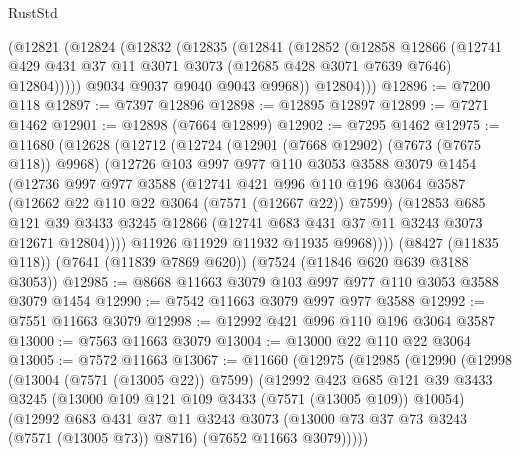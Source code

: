 \begin{lexlean}{RustStd}
\begin{coremodule}
        (@12821
          (@12824
            (@12832
              (@12835
                (@12841
                  (@12852
                    (@12858
                      @12866
                      (@12741
                        @429
                        @431
                        @37
                        @11
                        @3071
                        @3073
                        (@12685 @428 @3071 @7639 @7646)
                        @12804)))))
              @9034
              @9037
              @9040
              @9043
              @9968))
          @12804)))
@12896 := @7200 @118
@12897 := @7397 @12896
@12898 := @12895 @12897
@12899 := @7271 @1462
@12901 := @12898 (@7664 @12899)
@12902 := @7295 @1462
@12975 := @11680
    (@12628
      (@12712
        (@12724
          (@12901 (@7668 @12902) (@7673 (@7675 @118)) @9968)
          (@12726
            @103
            @997
            @977
            @110
            @3053
            @3588
            @3079
            @1454
            (@12736
              @997
              @977
              @3588
              (@12741
                @421
                @996
                @110
                @196
                @3064
                @3587
                (@12662 @22 @110 @22 @3064 (@7571 (@12667 @22)) @7599)
                (@12853
                  @685
                  @121
                  @39
                  @3433
                  @3245
                  @12866
                  (@12741 @683 @431 @37 @11 @3243 @3073 @12671 @12804))))
            @11926
            @11929
            @11932
            @11935
            @9968))))
    (@8427 (@11835 @118))
    (@7641 (@11839 @7869 @620))
    (@7524 (@11846 @620 @639 @3188 @3053))
@12985 := @8668 @11663 @3079 @103 @997 @977 @110 @3053 @3588 @3079 @1454
@12990 := @7542 @11663 @3079 @997 @977 @3588
@12992 := @7551 @11663 @3079
@12998 := @12992 @421 @996 @110 @196 @3064 @3587
@13000 := @7563 @11663 @3079
@13004 := @13000 @22 @110 @22 @3064
@13005 := @7572 @11663
@13067 := @11660
    (@12975
      (@12985
        (@12990
          (@12998
            (@13004 (@7571 (@13005 @22)) @7599)
            (@12992
              @423
              @685
              @121
              @39
              @3433
              @3245
              (@13000 @109 @121 @109 @3433 (@7571 (@13005 @109)) @10054)
              (@12992
                @683
                @431
                @37
                @11
                @3243
                @3073
                (@13000 @73 @37 @73 @3243 (@7571 (@13005 @73)) @8716)
                (@7652 @11663 @3079)))))

\end{coremodule}
\end{lexlean}
